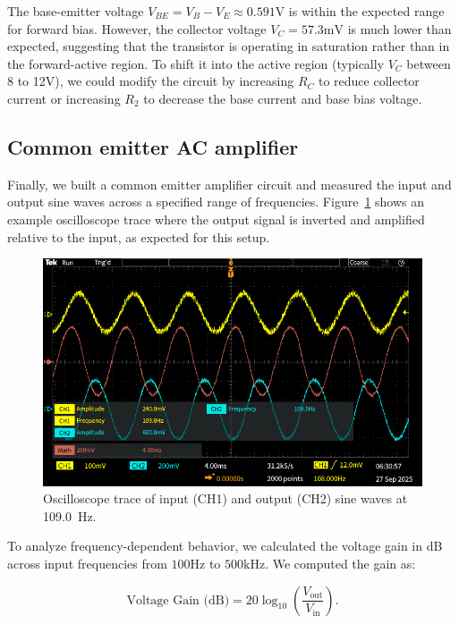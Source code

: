 \documentclass{article}
\begin{document}
\noindent The base-emitter voltage $V_{BE} = V_B - V_E \approx 0.591\si{\volt}$ is 
within the expected range for forward bias. However, the collector voltage 
$V_C = 57.3\si{\milli\volt}$ is much lower than expected, suggesting that the 
transistor is operating in saturation rather than in the forward-active region. 
To shift it into the active region (typically $V_C$ between 8 to 12V), we could
modify the circuit by increasing $R_C$ to reduce collector current or increasing 
$R_2$ to decrease the base current and base bias voltage.


\subsection{Common emitter AC amplifier}

Finally, we built a common emitter amplifier circuit and measured the input
and output sine waves across a specified range of frequencies. Figure~\ref{fig:scope_trace}
shows an example oscilloscope trace where the output signal is inverted and
amplified relative to the input, as expected for this setup.

\begin{figure}[H]
    \centering
    \includegraphics[width=0.7\linewidth]{5.4.3.png}
    \caption{Oscilloscope trace of input (CH1) and output (CH2) sine waves at \SI{109.0}{\hertz}.}
    \label{fig:scope_trace}
\end{figure}

\noindent To analyze frequency-dependent behavior, we calculated the voltage gain in dB
across input frequencies from $100\si{\hertz}$ to $500\si{\kilo\hertz}$. We
computed the gain as:

\begin{equation}
    \text{Voltage Gain (dB)}=20\log_{10}\left(\frac{V_{\text{out}}}{V_{\text{in}}}\right).
\end{equation}
\end{document}
